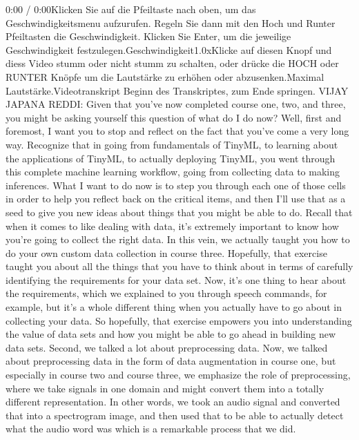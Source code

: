  0:00 / 0:00Klicken Sie auf die Pfeiltaste nach oben, um das Geschwindigkeitsmenu aufzurufen. Regeln Sie dann mit den Hoch und Runter Pfeiltasten die Geschwindigkeit. Klicken Sie Enter, um die jeweilige Geschwindigkeit festzulegen.Geschwindigkeit1.0xKlicke auf diesen Knopf und diess Video stumm oder nicht stumm zu schalten, oder drücke die HOCH oder RUNTER Knöpfe um die Lautstärke zu erhöhen oder abzusenken.Maximal Lautstärke.Videotranskript
    Beginn des Transkriptes, zum Ende springen.
    VIJAY JAPANA REDDI: Given that you've now completed course one, two,
    and three, you might be asking yourself this question of what do I do now?
    Well, first and foremost, I want you to stop and reflect on the fact
    that you've come a very long way.
    Recognize that in going from fundamentals of TinyML,
    to learning about the applications of TinyML, to actually deploying TinyML,
    you went through this complete machine learning workflow,
    going from collecting data to making inferences.
    What I want to do now is to step you through each one of those cells
    in order to help you reflect back on the critical items,
    and then I'll use that as a seed to give you new ideas about things
    that you might be able to do.
    Recall that when it comes to like dealing with data,
    it's extremely important to know how you're going to collect the right data.
    In this vein, we actually taught you how to do your own custom data
    collection in course three.
    Hopefully, that exercise taught you about all the things
    that you have to think about in terms of carefully identifying
    the requirements for your data set.
    Now, it's one thing to hear about the requirements, which we explained
    to you through speech commands, for example,
    but it's a whole different thing when you actually have
    to go about in collecting your data.
    So hopefully, that exercise empowers you into understanding the value of data
    sets and how you might be able to go ahead in building new data sets.
    Second, we talked a lot about preprocessing data.
    Now, we talked about preprocessing data in the form of data
    augmentation in course one, but especially
    in course two and course three, we emphasize the role
    of preprocessing, where we take signals in one domain
    and might convert them into a totally different representation.
    In other words, we took an audio signal and converted that
    into a spectrogram image, and then used that to be
    able to actually detect what the audio word was which is a remarkable process
    that we did.
